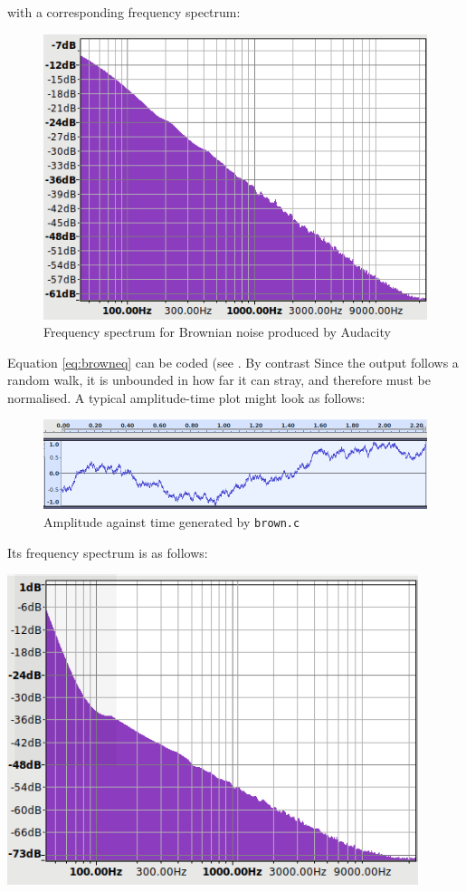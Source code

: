 \documentclass[a4paper,10pt]{article}
\def\code#1{\texttt{#1}}
\begin{document}
with a corresponding frequency spectrum:
\begin{figure}[h]
	\centering
	\includegraphics[width=12cm]{brown-freq-audacity.png}
	\caption{Frequency spectrum for Brownian noise produced by Audacity}
	\label{fig:bfa}
\end{figure}
 
Equation \ref{eq:browneq} can be coded (see . By contrast
Since the output follows a random walk, it is unbounded in how far it can stray, and therefore must be normalised. A typical amplitude-time plot might look as follows:

\begin{figure}[h]
\centering
\includegraphics[width=12cm]{brown-amp.png}
\caption{Amplitude against time generated by \code{brown.c}}
\label{fig:brownamp}
\end{figure}

Its frequency spectrum is as follows:
\begin{center}
\includegraphics[width=12cm]{brown-freq.png}
\end{center}
\end{document}
